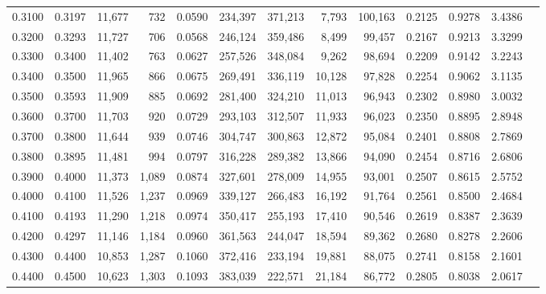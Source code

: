 \begin{tabular}{rrrrrrrrrrrrr}
0.3100 & 0.3197 & 11,677 &   732 &                                     0.0590 & 234,397 & 371,213 &   7,793 & 100,163 & 0.2125 & 0.9278 & 3.4386 \\
0.3200 & 0.3293 & 11,727 &   706 &                                     0.0568 & 246,124 & 359,486 &   8,499 &  99,457 & 0.2167 & 0.9213 & 3.3299 \\
0.3300 & 0.3400 & 11,402 &   763 &                                     0.0627 & 257,526 & 348,084 &   9,262 &  98,694 & 0.2209 & 0.9142 & 3.2243 \\
0.3400 & 0.3500 & 11,965 &   866 &                                     0.0675 & 269,491 & 336,119 &  10,128 &  97,828 & 0.2254 & 0.9062 & 3.1135 \\
0.3500 & 0.3593 & 11,909 &   885 &                                     0.0692 & 281,400 & 324,210 &  11,013 &  96,943 & 0.2302 & 0.8980 & 3.0032 \\
0.3600 & 0.3700 & 11,703 &   920 &                                     0.0729 & 293,103 & 312,507 &  11,933 &  96,023 & 0.2350 & 0.8895 & 2.8948 \\
0.3700 & 0.3800 & 11,644 &   939 &                                     0.0746 & 304,747 & 300,863 &  12,872 &  95,084 & 0.2401 & 0.8808 & 2.7869 \\
0.3800 & 0.3895 & 11,481 &   994 &                                     0.0797 & 316,228 & 289,382 &  13,866 &  94,090 & 0.2454 & 0.8716 & 2.6806 \\
0.3900 & 0.4000 & 11,373 & 1,089 &                                     0.0874 & 327,601 & 278,009 &  14,955 &  93,001 & 0.2507 & 0.8615 & 2.5752 \\
0.4000 & 0.4100 & 11,526 & 1,237 &                                     0.0969 & 339,127 & 266,483 &  16,192 &  91,764 & 0.2561 & 0.8500 & 2.4684 \\
0.4100 & 0.4193 & 11,290 & 1,218 &                                     0.0974 & 350,417 & 255,193 &  17,410 &  90,546 & 0.2619 & 0.8387 & 2.3639 \\
0.4200 & 0.4297 & 11,146 & 1,184 &                                     0.0960 & 361,563 & 244,047 &  18,594 &  89,362 & 0.2680 & 0.8278 & 2.2606 \\
0.4300 & 0.4400 & 10,853 & 1,287 &                                     0.1060 & 372,416 & 233,194 &  19,881 &  88,075 & 0.2741 & 0.8158 & 2.1601 \\
0.4400 & 0.4500 & 10,623 & 1,303 &                                     0.1093 & 383,039 & 222,571 &  21,184 &  86,772 & 0.2805 & 0.8038 & 2.0617 \\

\end{tabular}
